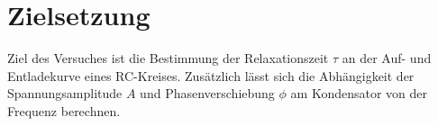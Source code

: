 \section{Zielsetzung} 
Ziel des Versuches ist die Bestimmung der Relaxationszeit $\tau$ an der Auf- und Entladekurve eines RC-Kreises. Zusätzlich lässt sich die Abhängigkeit der Spannungsamplitude $A$ und Phasenverschiebung $\phi$ am Kondensator von der Frequenz berechnen.